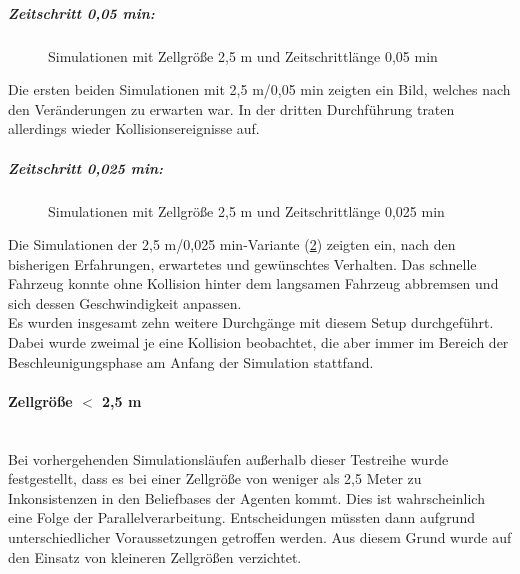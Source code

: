 \subparagraph*{Zeitschritt 0,05 min:}
\begin{figure}[hptb]
  \centering 
   \qquad 
   \qquad 
  \caption{Simulationen mit Zellgröße 2,5 m und Zeitschrittlänge 0,05 min} 
  \label{figure:run24-26}
\end{figure}

Die ersten beiden Simulationen mit 2,5 m/0,05 min zeigten ein Bild, welches nach den Veränderungen zu erwarten war.
In der dritten Durchführung traten allerdings wieder Kollisionsereignisse auf.

\subparagraph*{Zeitschritt 0,025 min:}
\begin{figure}[hptb]
  \centering 
   \qquad 
   \qquad 
  \caption{Simulationen mit Zellgröße 2,5 m und Zeitschrittlänge 0,025 min} 
  \label{figure:run27-29}
\end{figure}

Die Simulationen der 2,5 m/0,025 min-Variante (\cref{figure:run27-29}) zeigten ein, nach den bisherigen Erfahrungen, erwartetes und gewünschtes Verhalten.
Das schnelle Fahrzeug konnte ohne Kollision hinter dem langsamen Fahrzeug abbremsen und sich dessen Geschwindigkeit anpassen.
\\
Es wurden insgesamt zehn weitere Durchgänge mit diesem Setup durchgeführt. 
Dabei wurde zweimal je eine Kollision beobachtet, die aber immer im Bereich der Beschleunigungsphase am Anfang der Simulation stattfand. 


\paragraph*{\texorpdfstring{Zellgröße $ < $ 2,5 m}%
                              {Zellgröße kleiner als 2,5 m}}
\hfill \\
Bei vorhergehenden Simulationsläufen außerhalb dieser Testreihe wurde festgestellt, dass es bei einer Zellgröße von weniger als 2,5 Meter zu Inkonsistenzen in den Beliefbases der Agenten kommt.
Dies ist wahrscheinlich eine Folge der Parallelverarbeitung.
Entscheidungen müssten dann aufgrund unterschiedlicher Voraussetzungen getroffen werden.
Aus diesem Grund wurde auf den Einsatz von kleineren Zellgrößen verzichtet.



